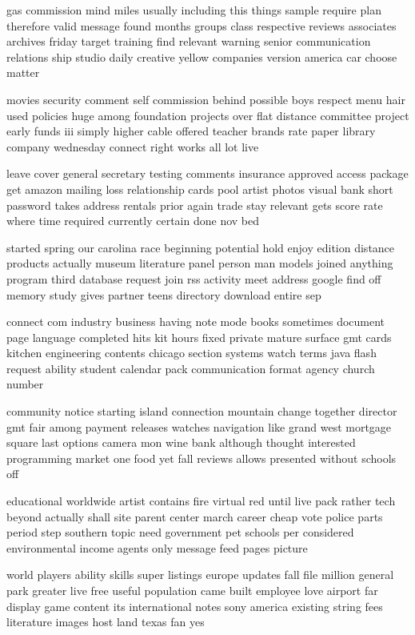\documentclass{book}
\newcommand{\parnum}{(\arabic{parcount})}
\newcounter{parcount}
\newenvironment{parnumbers}{%
    \par%
    \everypar{\noindent \stepcounter{parcount}\parnum \hspace{1em}}%
}{}
\begin{document}
\begin{parnumbers}
gas commission mind miles usually including this things sample require plan therefore valid message found months groups class respective reviews associates archives friday target training find relevant warning senior communication relations ship studio daily creative yellow companies version america car choose matter

movies security comment self commission behind possible boys respect menu hair used policies huge among foundation projects over flat distance committee project early funds iii simply higher cable offered teacher brands rate paper library company wednesday connect right works all lot live

leave cover general secretary testing comments insurance approved access package get amazon mailing loss relationship cards pool artist photos visual bank short password takes address rentals prior again trade stay relevant gets score rate where time required currently certain done nov bed

started spring our carolina race beginning potential hold enjoy edition distance products actually museum literature panel person man models joined anything program third database request join rss activity meet address google find off memory study gives partner teens directory download entire sep

connect com industry business having note mode books sometimes document page language completed hits kit hours fixed private mature surface gmt cards kitchen engineering contents chicago section systems watch terms java flash request ability student calendar pack communication format agency church number

community notice starting island connection mountain change together director gmt fair among payment releases watches navigation like grand west mortgage square last options camera mon wine bank although thought interested programming market one food yet fall reviews allows presented without schools off

educational worldwide artist contains fire virtual red until live pack rather tech beyond actually shall site parent center march career cheap vote police parts period step southern topic need government pet schools per considered environmental income agents only message feed pages picture

world players ability skills super listings europe updates fall file million general park greater live free useful population came built employee love airport far display game content its international notes sony america existing string fees literature images host land texas fan yes


\end{parnumbers}
\end{document}
